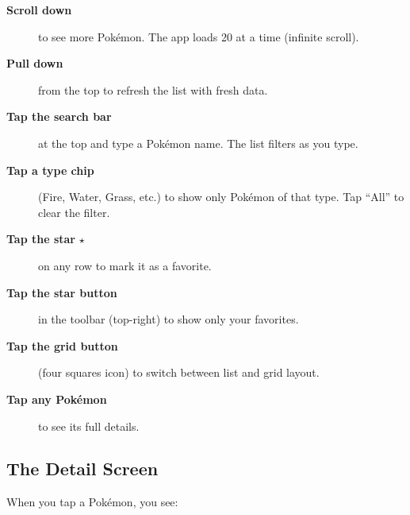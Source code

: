 \documentclass[11pt,a4paper]{article}
\begin{document}
\begin{description}
    \item[\textbf{Scroll down}] to see more Pok\'{e}mon. The app loads 20 at a time (infinite scroll).
    \item[\textbf{Pull down}] from the top to refresh the list with fresh data.
    \item[\textbf{Tap the search bar}] at the top and type a Pok\'{e}mon name. The list filters as you type.
    \item[\textbf{Tap a type chip}] (Fire, Water, Grass, etc.) to show only Pok\'{e}mon of that type. Tap ``All'' to clear the filter.
    \item[\textbf{Tap the star} $\star$] on any row to mark it as a favorite.
    \item[\textbf{Tap the star button}] in the toolbar (top-right) to show only your favorites.
    \item[\textbf{Tap the grid button}] (four squares icon) to switch between list and grid layout.
    \item[\textbf{Tap any Pok\'{e}mon}] to see its full details.
\end{description}

\subsection{The Detail Screen}

When you tap a Pok\'{e}mon, you see:
\end{document}
